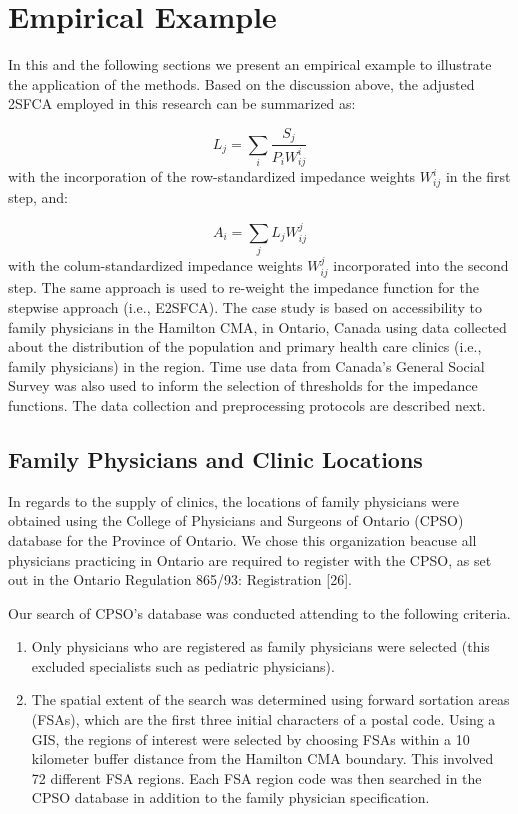 \documentclass[10pt,letterpaper]{article}
\begin{document}
\section{Empirical Example}\label{empirical-example}

In this and the following sections we present an empirical example to
illustrate the application of the methods. Based on the discussion
above, the adjusted 2SFCA employed in this research can be summarized
as:

\[
L_{j}=\sum_i\frac{S_j}{P_iW_{ij}^{i}}
\] with the incorporation of the row-standardized impedance weights
\(W_{ij}^i\) in the first step, and:

\[
A_i = \sum_j{L_jW_{ij}^{j}}
\] with the colum-standardized impedance weights \(W_{ij}^j\)
incorporated into the second step. The same approach is used to
re-weight the impedance function for the stepwise approach (i.e.,
E2SFCA). The case study is based on accessibility to family physicians
in the Hamilton CMA, in Ontario, Canada using data collected about the
distribution of the population and primary health care clinics (i.e.,
family physicians) in the region. Time use data from Canada's General
Social Survey was also used to inform the selection of thresholds for
the impedance functions. The data collection and preprocessing protocols
are described next.

\subsection{Family Physicians and Clinic
Locations}\label{family-physicians-and-clinic-locations}

In regards to the supply of clinics, the locations of family physicians
were obtained using the College of Physicians and Surgeons of Ontario
(CPSO) database for the Province of Ontario. We chose this organization
beacuse all physicians practicing in Ontario are required to register
with the CPSO, as set out in the Ontario Regulation 865/93: Registration
{[}26{]}.

Our search of CPSO's database was conducted attending to the following
criteria.

\begin{enumerate}
\def\labelenumi{\arabic{enumi})}
\item
  Only physicians who are registered as family physicians were selected
  (this excluded specialists such as pediatric physicians).
\item
  The spatial extent of the search was determined using forward
  sortation areas (FSAs), which are the first three initial characters
  of a postal code. Using a GIS, the regions of interest were selected
  by choosing FSAs within a 10 kilometer buffer distance from the
  Hamilton CMA boundary. This involved 72 different FSA regions. Each
  FSA region code was then searched in the CPSO database in addition to
  the family physician specification.
\end{enumerate}
\end{document}
